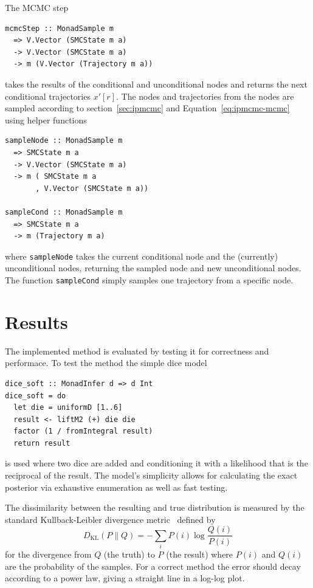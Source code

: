 The MCMC step
\begin{verbatim}
mcmcStep :: MonadSample m
  => V.Vector (SMCState m a) 
  -> V.Vector (SMCState m a)
  -> m (V.Vector (Trajectory m a))
\end{verbatim}
takes the results of the conditional and unconditional nodes and returns the next conditional trajectories $x'[r]$. The nodes and trajectories from the nodes are sampled according to section~\ref{sec:ipmcmc} and Equation~\ref{eq:ipmcmc-mcmc} using helper functions
\begin{verbatim}
sampleNode :: MonadSample m
  => SMCState m a
  -> V.Vector (SMCState m a)
  -> m ( SMCState m a
       , V.Vector (SMCState m a))

sampleCond :: MonadSample m
  => SMCState m a
  -> m (Trajectory m a)
\end{verbatim}
where \texttt{sampleNode} takes the current conditional node and the (currently) unconditional nodes, returning the sampled node and new unconditional nodes. The function \texttt{sampleCond} simply samples one trajectory from a specific node.

\section{Results}

The implemented method is evaluated by testing it for correctness and performace. To test the method the simple dice model
\begin{verbatim}
dice_soft :: MonadInfer d => d Int
dice_soft = do
  let die = uniformD [1..6]
  result <- liftM2 (+) die die
  factor (1 / fromIntegral result)
  return result
\end{verbatim}
is used where two dice are added and conditioning it with a likelihood that is the reciprocal of the result. The model's simplicity allows for calculating the exact posterior via exhaustive enumeration as well as fast testing.

The dissimilarity between the resulting and true distribution is measured by the standard Kullback-Leibler divergence metric~\cite{kl} defined by
\begin{equation}\label{eq:kl}
    D_{\mathrm{KL}} (P \parallel Q) = - \sum\limits_i P(i) \log \frac {Q(i)}{P(i)}
\end{equation}
for the divergence from $Q$ (the truth) to $P$ (the result) where $P(i)$ and $Q(i)$ are the probability of the samples. For a correct method the error should decay according to a power law, giving a straight line in a log-log plot.

